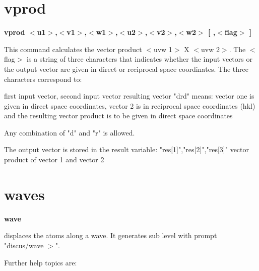\section{vprod}
{\bf vprod $ <$u1$> $,$ <$v1$> $,$ <$w1$> $,$ <$u2$> $,$ <$v2$> $,$ <$w2$> $ [ ,$ <$flag$> $ ] \par }
\par
\vspace{3pt}
This command calculates the vector product $ <$uvw 1$> $ X $ <$uvw 2$> $. 
The $ <$flag$> $ is a string of three characters that indicates whether the 
input vectors or the output vector are given in direct or reciprocal 
space coordinates. The three characters correspond to: 
\par
\begin{MacVerbatim}
   first input vector,
   second input vector
   resulting vector
"drd" means: vector one is given in direct space coordinates, vector 2
             is in reciprocal space coordinates (hkl) and the
             resulting vector product is to be given in direct space
             coordinates
\end{MacVerbatim}
Any combination of "d" and "r" is allowed. 
\par
The output vector is stored in the result variable: 
"res[1]","res[2]","res[3]" vector product of vector 1 and vector 2 
\section{waves}
{\bf wave \par }
\par
\vspace{3pt}
displaces the atoms along a wave. It generates sub level with prompt 
"discus/wave $> $". 
\par
Further help topics are: 
\par
